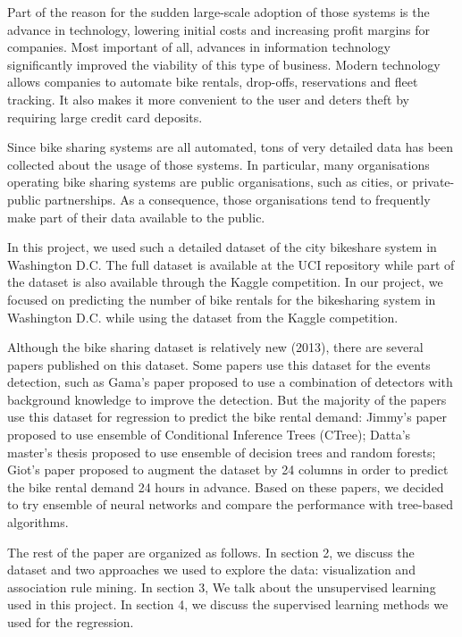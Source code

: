 \documentclass[12pt]{article}
\begin{document}
Part of the reason for the sudden large-scale adoption of those systems is the advance in technology, lowering initial costs and increasing profit margins for companies. Most important of all, advances in information technology significantly improved the viability of this type of business. Modern technology allows companies to automate bike rentals, drop-offs, reservations and fleet tracking. It also makes it more convenient to the user and deters theft by requiring large credit card deposits.

Since bike sharing systems are all automated, tons of very detailed data has been collected about the usage of those systems. In particular, many organisations operating bike sharing systems are public organisations, such as cities, or private-public partnerships. As a consequence, those organisations tend to frequently make part of their data available to the public.

In this project, we used such a detailed dataset of the city bikeshare system in Washington D.C. The full dataset is available at the UCI repository \cite{dataset} while part of the dataset is also available through the Kaggle competition. In our project, we focused on predicting the number of bike rentals for the bikesharing system in Washington D.C. while using the dataset from the Kaggle competition.

Although the bike sharing dataset is relatively new (2013), there are several papers published on this dataset. Some papers use this dataset for the events detection, such as Gama's paper \cite{dataset} proposed to use a combination of detectors with background knowledge to improve the detection. But the majority of the papers use this dataset for regression to predict the bike rental demand: Jimmy's paper proposed to use ensemble of Conditional Inference Trees (CTree); Datta's master's thesis \cite{master} proposed to use ensemble of decision trees and random forests; Giot's paper \cite{romain} proposed to augment the dataset by 24 columns in order to predict the bike rental demand 24 hours in advance. Based on these papers, we decided to try ensemble of neural networks and compare the performance with tree-based algorithms. 

The rest of the paper are organized as follows. In section 2, we discuss the dataset and two approaches we used to explore the data: visualization and association rule mining. In section 3,  We talk about the unsupervised learning used in this project. In section 4,  we discuss the supervised learning  methods we used for the regression.
	
\end{document}
